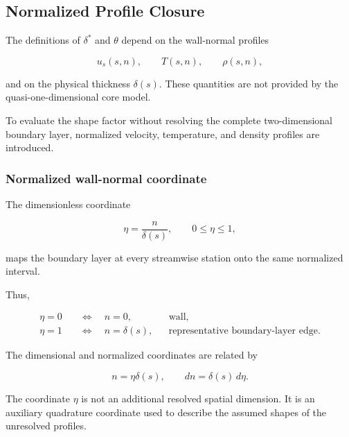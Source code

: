 \subsection{Normalized Profile Closure}

The definitions of \(\delta^*\) and \(\theta\) depend on the wall-normal
profiles

\begin{equation}
    u_s(s,n),\qquad
    T(s,n),\qquad
    \rho(s,n),
\end{equation}

and on the physical thickness \(\delta(s)\). These quantities are not provided
by the quasi-one-dimensional core model.

To evaluate the shape factor without resolving the complete two-dimensional
boundary layer, normalized velocity, temperature, and density profiles are
introduced.

\subsubsection{Normalized wall-normal coordinate}

The dimensionless coordinate

\begin{equation}
    \boxed{
    \eta
    =
    \frac{n}{\delta(s)}
    },
    \qquad
    0\leq\eta\leq1,
    \label{eq:normalized_wall_coordinate}
\end{equation}

maps the boundary layer at every streamwise station onto the same normalized
interval.

Thus,

\begin{align}
    \eta=0
    &\quad\Longleftrightarrow\quad
    n=0,
    &&\text{wall},
    \\
    \eta=1
    &\quad\Longleftrightarrow\quad
    n=\delta(s),
    &&\text{representative boundary-layer edge}.
\end{align}

The dimensional and normalized coordinates are related by

\begin{equation}
    n=\eta\delta(s),
    \qquad
    dn=\delta(s)\,d\eta.
    \label{eq:normal_coordinate_transformation}
\end{equation}

The coordinate \(\eta\) is not an additional resolved spatial dimension. It is
an auxiliary quadrature coordinate used to describe the assumed shapes of the
unresolved profiles.

